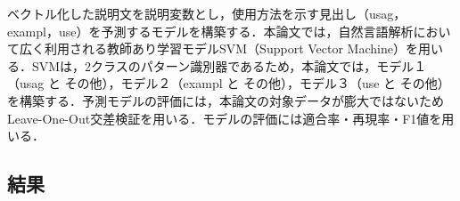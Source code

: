 \documentclass[uplatex,dvipdfmx,a4paper,twocolumn,base=11pt,jbase=11pt,ja=standard]{bxjsarticle}  %
\begin{document}
ベクトル化した説明文を説明変数とし，使用方法を示す見出し（usag，exampl，use）を予測するモデルを構築する．本論文では，自然言語解析において広く利用される教師あり学習モデルSVM（Support Vector Machine）を用いる．SVMは，2クラスのパターン識別器であるため，本論文では，モデル１（usag と その他），モデル２（exampl と その他），モデル３（use と その他）を構築する．予測モデルの評価には，本論文の対象データが膨大ではないためLeave-One-Out交差検証を用いる．モデルの評価には適合率・再現率・F1値を用いる．







\subsection{結果}


\begin{table}[t]
 \centering
 \caption{予測結果}
\label{tab:result}
    \vspace{-7mm}
\end{table}
\end{document}
